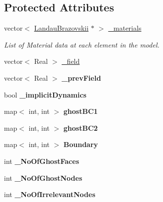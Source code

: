 \subsection*{Protected Attributes}
\begin{DoxyCompactItemize}
\item 
\hypertarget{classvoom_1_1_l_b_model_a7bb53d098be6d2d501b8b9c7914f07d6}{
vector$<$ \hyperlink{classvoom_1_1_landau_brazovskii}{LandauBrazovskii} $\ast$ $>$ \hyperlink{classvoom_1_1_l_b_model_a7bb53d098be6d2d501b8b9c7914f07d6}{\_\-materials}}
\label{classvoom_1_1_l_b_model_a7bb53d098be6d2d501b8b9c7914f07d6}

\begin{DoxyCompactList}\small\item\em List of Material data at each element in the model. \item\end{DoxyCompactList}\item 
vector$<$ Real $>$ \hyperlink{classvoom_1_1_l_b_model_a4e7d5fadb92531299a2fe25ec76b7efa}{\_\-field}
\item 
\hypertarget{classvoom_1_1_l_b_model_abd5b0f6b7648c6589af6be1ef22511b1}{
vector$<$ Real $>$ {\bfseries \_\-prevField}}
\label{classvoom_1_1_l_b_model_abd5b0f6b7648c6589af6be1ef22511b1}

\item 
\hypertarget{classvoom_1_1_l_b_model_a9f293a1060431d52513787cc678b0671}{
bool {\bfseries \_\-implicitDynamics}}
\label{classvoom_1_1_l_b_model_a9f293a1060431d52513787cc678b0671}

\item 
\hypertarget{classvoom_1_1_l_b_model_a1af5210c59870e1d2c6c64e3ecbccd71}{
map$<$ int, int $>$ {\bfseries ghostBC1}}
\label{classvoom_1_1_l_b_model_a1af5210c59870e1d2c6c64e3ecbccd71}

\item 
\hypertarget{classvoom_1_1_l_b_model_a23a92bcc8ddbef00c966e47730ca9ba6}{
map$<$ int, int $>$ {\bfseries ghostBC2}}
\label{classvoom_1_1_l_b_model_a23a92bcc8ddbef00c966e47730ca9ba6}

\item 
\hypertarget{classvoom_1_1_l_b_model_aecdd431508ba47aa4ef6660ff3a0a466}{
map$<$ int, int $>$ {\bfseries Boundary}}
\label{classvoom_1_1_l_b_model_aecdd431508ba47aa4ef6660ff3a0a466}

\item 
\hypertarget{classvoom_1_1_l_b_model_ad07bb023cdfd8184b646d5f91ce33dc5}{
int {\bfseries \_\-NoOfGhostFaces}}
\label{classvoom_1_1_l_b_model_ad07bb023cdfd8184b646d5f91ce33dc5}

\item 
\hypertarget{classvoom_1_1_l_b_model_a01d5acb594b05e97344ee448b7dc8ca1}{
int {\bfseries \_\-NoOfGhostNodes}}
\label{classvoom_1_1_l_b_model_a01d5acb594b05e97344ee448b7dc8ca1}

\item 
\hypertarget{classvoom_1_1_l_b_model_a626a8562947e31e8de293f59ea98bb34}{
int {\bfseries \_\-NoOfIrrelevantNodes}}
\label{classvoom_1_1_l_b_model_a626a8562947e31e8de293f59ea98bb34}

\end{DoxyCompactItemize}


